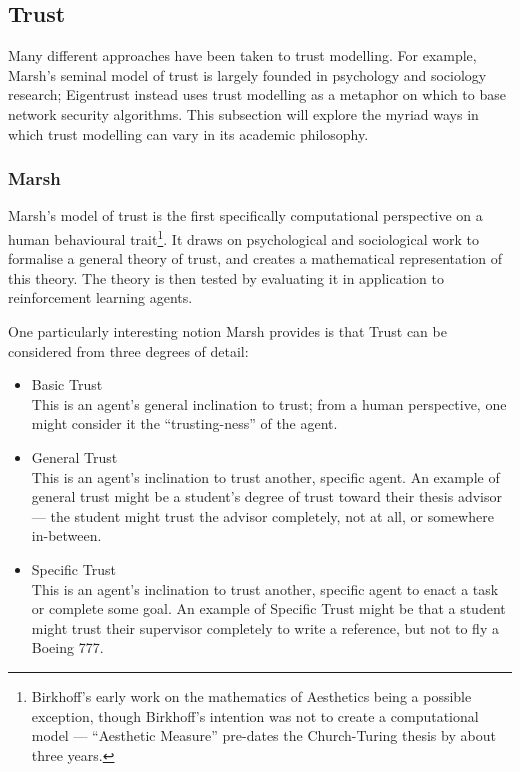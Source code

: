 \subsection{Trust}\label{sec:trust}
Many different approaches have been taken to trust modelling. For example, Marsh's seminal model of trust\cite{marsh1994} is largely founded in psychology and sociology research; Eigentrust\cite{Kamvar2003} instead uses trust modelling as a metaphor on which to base network security algorithms. This subsection will explore the myriad ways in which trust modelling can vary in its academic philosophy.\par

\subsubsection*{Marsh}\label{sec:marsh}
Marsh's model of trust is the first specifically computational perspective on a human behavioural trait\footnote{Birkhoff's early work on the mathematics of Aesthetics\cite{Birkhoff1933} being a possible exception, though Birkhoff's intention was not to create a computational model --- ``Aesthetic Measure'' pre-dates the Church-Turing thesis by about three years.}. It draws on psychological and sociological work to formalise a general theory of trust, and creates a mathematical representation of this theory. The theory is then tested by evaluating it in application to reinforcement learning agents.\par

One particularly interesting notion Marsh provides is that Trust can be considered from three degrees of detail:
\begin{itemize}
    \item Basic Trust\\
        This is an agent's general inclination to trust; from a human perspective, one might consider it the ``trusting-ness'' of the agent.
    \item General Trust\\
        This is an agent's inclination to trust another, specific agent. An example of general trust might be a student's degree of trust toward their thesis advisor --- the student might trust the advisor completely, not at all, or somewhere in-between.
    \item Specific Trust\\
        This is an agent's inclination to trust another, specific agent to enact a task or complete some goal. An example of Specific Trust might be that a student might trust their supervisor completely to write a reference, but not to fly a Boeing 777.
\end{itemize}

